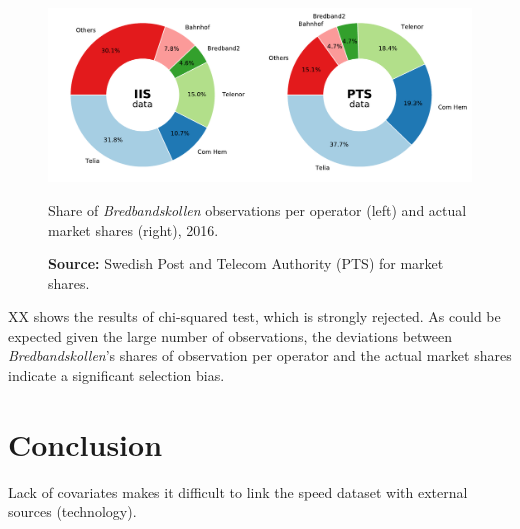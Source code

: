 \documentclass[12pt]{article}
\begin{document}
\begin{figure}[H]
    \centering
        \includegraphics[width=\linewidth]{donuts_operators.pdf}
        \caption{Share of \textit{Bredbandskollen} observations per operator (left) and actual market shares (right), 2016.}
        \label{fig:a11}
        \caption*{\textbf{Source:} Swedish Post and Telecom Authority (PTS) for market shares.}
\end{figure}   

XX shows the results of chi-squared test, which is strongly rejected. As could be expected given the large number of observations, the deviations between \textit{Bredbandskollen}'s shares of observation per operator and the actual market shares indicate a significant selection bias.   

\section{Conclusion}
Lack of covariates makes it difficult to link the speed dataset with external sources (technology).




\end{document}
